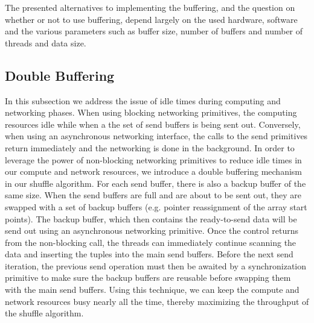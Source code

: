 The presented alternatives to implementing the buffering, and the question on whether or not to use buffering, depend largely on the used hardware, software and the various parameters such as buffer size, number of buffers and number of threads and data size.

\subsection{Double Buffering}
\label{sec:shuffle:double-buffering}

In this subsection we address the issue of idle times during computing and networking phases.
When using blocking networking primitives, the computing resources idle while when a the set of send buffers is being sent out.
Conversely, when using an asynchronous networking interface, the calls to the send primitives return immediately and the networking is done in the background.
In order to leverage the power of non-blocking networking primitives to reduce idle times in our compute and network resources, we introduce a double buffering mechanism in our shuffle algorithm.
For each send buffer, there is also a backup buffer of the same size.
When the send buffers are full and are about to be sent out, they are swapped with a set of backup buffers (e.g. pointer reassignment of the array start points).
The backup buffer, which then contains the ready-to-send data will be send out using an asynchronous networking primitive.
Once the control returns from the non-blocking call, the threads can immediately continue scanning the data and inserting the tuples into the main send buffers.
Before the next send iteration, the previous send operation must then be awaited by a synchronization primitive to make sure the backup buffers are reusable before swapping them with the main send buffers.
Using this technique, we can keep the compute and network resources busy nearly all the time, thereby maximizing the throughput of the shuffle algorithm.